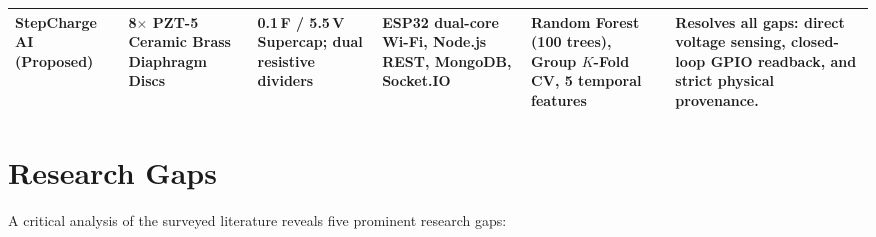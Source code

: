 \begin{landscape}
\begin{table}[p]
\begin{tabularx}{\linewidth}{@{} L{1.3in} L{1.2in} L{1.3in} L{1.3in} L{1.4in} Y @{}}
\midrule
{}
\textbf{StepCharge AI (Proposed)} & \textbf{8$\times$ PZT-5 Ceramic Brass Diaphragm Discs} & \textbf{0.1\,F / 5.5\,V Supercap; dual resistive dividers} & \textbf{ESP32 dual-core Wi-Fi, Node.js REST, MongoDB, Socket.IO} & \textbf{Random Forest (100 trees), Group $K$-Fold CV, 5 temporal features} & \textbf{Resolves all gaps: direct voltage sensing, closed-loop GPIO readback, and strict physical provenance.} \\
\bottomrule
\end{tabularx}
\end{table}
\end{landscape}

\section{Research Gaps}
A critical analysis of the surveyed literature reveals five prominent research gaps:
